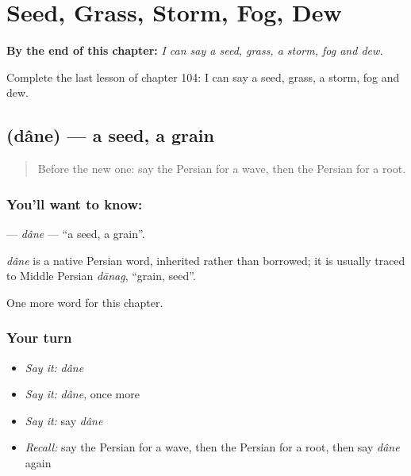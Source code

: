 
\chapter{Seed, Grass, Storm, Fog, Dew}
\label{ch:fa-seed-grass-storm-fog-dew}

\begin{chapteropening}
\textbf{By the end of this chapter:} \emph{I can say a seed, grass, a storm, fog and dew.}

Complete the last lesson of chapter 104: I can say a seed, grass, a storm, fog and dew.
\end{chapteropening}

\section[\texorpdfstring{\fa{دانه} (dâne)}{دانه (dâne)}]{ (dâne) — a seed, a grain}

\label{lesson:FA-C104-dane}



\begin{quote}
Before the new one: say the Persian for a wave, then the Persian for a root.
\end{quote}

\subsection*{You'll want to know: }
\textbf{} — \emph{dâne} — \textquotedblleft{}a seed, a grain\textquotedblright{}.

\begin{cousinweb}
\emph{dâne} is a native Persian word, inherited rather than borrowed; it is usually traced to Middle Persian \emph{dānag}, \textquotedblleft{}grain, seed\textquotedblright{}.
\end{cousinweb}

\begin{grammarlens}[title={What you've built}]
One more word for this chapter.
\end{grammarlens}

\subsection*{Your turn}
\begin{itemize}
\raggedright
  \item \emph{Say it:} \emph{dâne}
  \item \emph{Say it:} \emph{dâne}, once more
  \item \emph{Say it:} say \emph{dâne}
  \item \emph{Recall:} say the Persian for a wave, then the Persian for a root, then say \emph{dâne} again
\end{itemize}

